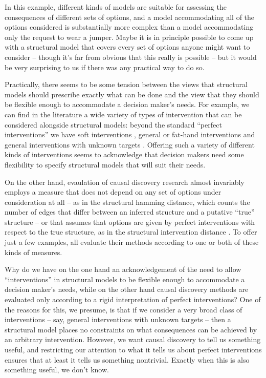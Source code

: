 In this example, different kinds of models are suitable for assessing the consequences of different sets of options, and a model accommodating all of the options considered is substantially more complex than a model accommodating only the request to wear a jumper. Maybe it is in principle possible to come up with a structural model that covers every set of options anyone might want to consider -- though it's far from obvious that this really is possible -- but it would be very surprising to us if there was any practical way to do so.

Practically, there seems to be some tension between the views that structural models should prescribe exactly what can be done and the view that they should be flexible enough to accommodate a decision maker's needs. For example, we can find in the literature a wide variety of types of intervention that can be considered alongside structural models: beyond the standard ``perfect interventions'' \citep[ch. ~1]{pearl_causality:_2009,hauser_characterization_2012} we have soft interventions \citep{correa_calculus_2020,eberhardt_interventions_2007}, general or fat-hand interventions \citep{eberhardt_interventions_2007,yang_characterizing_2018,glymour_evaluating_2017} and general interventions with unknown targets \citep{brouillard_differentiable_2020}. Offering such a variety of different kinds of interventions seems to acknowledge that decision makers need some flexibility to specify structural models that will suit their needs.

On the other hand, evaulation of causal discovery research almost invariably employs a measure that does not depend on any set of options under consideration at all -- as in the structural hamming distance, which counts the number of edges that differ between an inferred structure and a putative ``true'' structure -- or that assumes that options are given by perfect interventions with respect to the true structure, as in the structural intervention distance \citep{peters_structural_2015}. To offer just a few examples, \citet{brouillard_differentiable_2020,scherrer_learning_2022,toth_active_2022,forre_constraint-based_2018,chickering_optimal_2003,ng_graph_2019,zheng_dags_2018,spirtes_causation_1993} all evaluate their methods according to one or both of these kinds of measures.

Why do we have on the one hand an acknowledgement of the need to allow ``interventions'' in structural models to be flexible enough to accommodate a decision maker's needs, while on the other hand causal discovery methods are evaluated only according to a rigid interpretation of perfect interventions? One of the reasons for this, we presume, is that if we consider a very broad class of interventions -- say, general interventions with unknown targets -- then a structural model places no constraints on what consequences can be achieved by an arbitrary intervention. However, we want causal discovery to tell us something useful, and restricting our attention to what it tells us about perfect interventions ensures that at least it tells us something nontrivial. Exactly when this is also something useful, we don't know.

